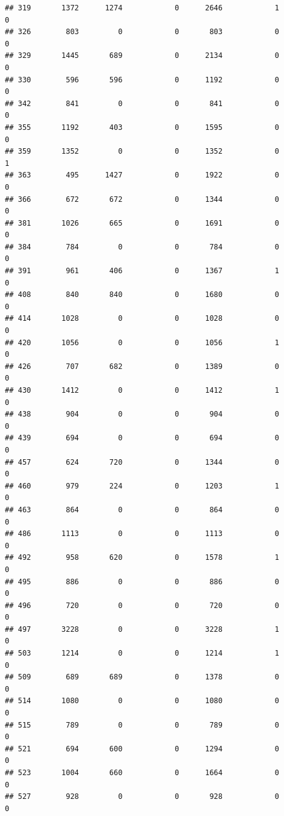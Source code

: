 \documentclass[]{article}
\begin{document}
\begin{verbatim}
## 319       1372      1274            0      2646            1            0
## 326        803         0            0       803            0            0
## 329       1445       689            0      2134            0            0
## 330        596       596            0      1192            0            0
## 342        841         0            0       841            0            0
## 355       1192       403            0      1595            0            0
## 359       1352         0            0      1352            0            1
## 363        495      1427            0      1922            0            0
## 366        672       672            0      1344            0            0
## 381       1026       665            0      1691            0            0
## 384        784         0            0       784            0            0
## 391        961       406            0      1367            1            0
## 408        840       840            0      1680            0            0
## 414       1028         0            0      1028            0            0
## 420       1056         0            0      1056            1            0
## 426        707       682            0      1389            0            0
## 430       1412         0            0      1412            1            0
## 438        904         0            0       904            0            0
## 439        694         0            0       694            0            0
## 457        624       720            0      1344            0            0
## 460        979       224            0      1203            1            0
## 463        864         0            0       864            0            0
## 486       1113         0            0      1113            0            0
## 492        958       620            0      1578            1            0
## 495        886         0            0       886            0            0
## 496        720         0            0       720            0            0
## 497       3228         0            0      3228            1            0
## 503       1214         0            0      1214            1            0
## 509        689       689            0      1378            0            0
## 514       1080         0            0      1080            0            0
## 515        789         0            0       789            0            0
## 521        694       600            0      1294            0            0
## 523       1004       660            0      1664            0            0
## 527        928         0            0       928            0            0

\end{verbatim}
\end{document}
